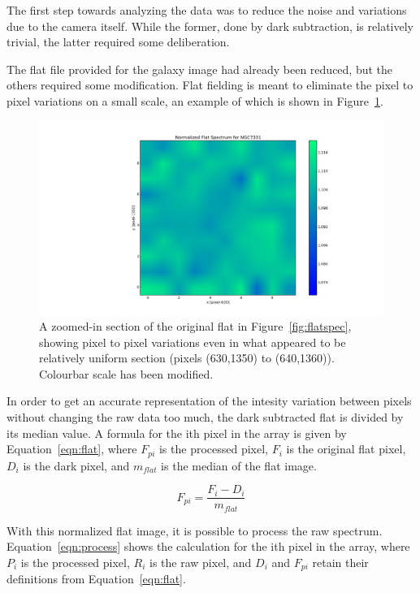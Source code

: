 \documentclass[a4paper,12pt]{article}
\begin{document}
The first step towards analyzing the data was to reduce the noise and variations due to the camera itself. While the former, done by dark subtraction, is relatively trivial, the latter required some deliberation.

The flat file provided for the galaxy image had already been reduced, but the others required some modification. Flat fielding is meant to eliminate the pixel to pixel variations on a small scale, an example of which is shown in Figure~\ref{fig:flatzoom}.

\begin{figure}[!htbp]
  \centering
  \includegraphics[width=\linewidth]{zoomflatspectrum.png}
  \caption{A zoomed-in section of the original flat in Figure~\ref{fig:flatspec}, showing pixel to pixel variations even in what appeared to be relatively uniform section (pixels (630,1350) to (640,1360)). Colourbar scale has been modified.}
  \label{fig:flatzoom}
\end{figure}

In order to get an accurate representation of the intesity variation between pixels without changing the raw data too much, the dark subtracted flat is divided by its median value. A formula for the ith pixel in the array is given by Equation~\ref{eqn:flat}, where $F_{pi}$ is the processed pixel, $F_{i}$ is the original flat pixel, $D_{i}$ is the dark pixel, and $m_{flat}$ is the median of the flat image.

\begin{equation}
F_{pi} = \frac{F_{i} - D_{i}}{m_{flat}}
\label{eqn:flat}
\end{equation}

With this normalized flat image, it is possible to process the raw spectrum. Equation~\ref{eqn:process} shows the calculation for the ith pixel in the array, where $P_{i}$ is the processed pixel, $R_{i}$ is the raw pixel, and $D_{i}$ and $F_{pi}$ retain their definitions from Equation~\ref{eqn:flat}.
\end{document}
